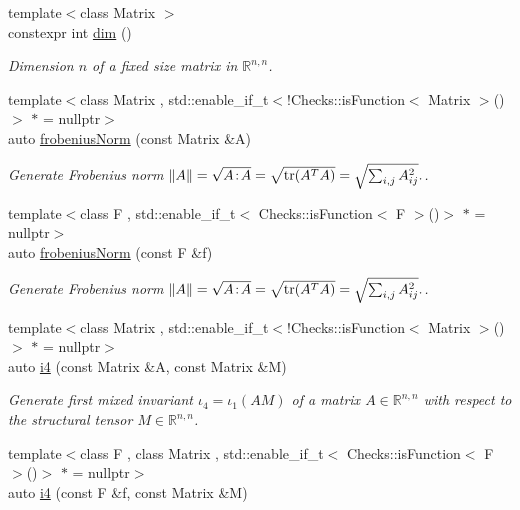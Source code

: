 \begin{DoxyCompactItemize}
{\footnotesize template$<$class Matrix $>$ }\\constexpr int \hyperlink{namespaceFunG_1_1LinearAlgebra_a13a029820c29d530274ae94968d642d4}{dim} ()
\begin{DoxyCompactList}\small\item\em Dimension $n$ of a fixed size matrix in $\mathbb{R}^{n,n}$. \end{DoxyCompactList}\item 
{\footnotesize template$<$class Matrix , std\-::enable\-\_\-if\-\_\-t$<$!\-Checks\-::is\-Function$<$ Matrix $>$()$>$ $\ast$  = nullptr$>$ }\\auto \hyperlink{group__LinearAlgebraGroup_gaa893e7d667dde98d2b119ca004745186}{frobenius\-Norm} (const Matrix \&A)
\begin{DoxyCompactList}\small\item\em Generate Frobenius norm $ \|A\| = \sqrt{A\negthinspace : \negthinspace A }= \sqrt{\mathrm{tr}(A^TA)} = \sqrt{\sum_{i,j} A_{ij}^2}. $. \end{DoxyCompactList}\item 
{\footnotesize template$<$class F , std\-::enable\-\_\-if\-\_\-t$<$ Checks\-::is\-Function$<$ F $>$()$>$ $\ast$  = nullptr$>$ }\\auto \hyperlink{group__LinearAlgebraGroup_gafa2f358f9310cecb787620ad8ec460a6}{frobenius\-Norm} (const F \&f)
\begin{DoxyCompactList}\small\item\em Generate Frobenius norm $ \|A\| = \sqrt{A\negthinspace : \negthinspace A }= \sqrt{\mathrm{tr}(A^TA)} = \sqrt{\sum_{i,j} A_{ij}^2}. $. \end{DoxyCompactList}\item 
{\footnotesize template$<$class Matrix , std\-::enable\-\_\-if\-\_\-t$<$!\-Checks\-::is\-Function$<$ Matrix $>$()$>$ $\ast$  = nullptr$>$ }\\auto \hyperlink{group__InvariantGroup_ga1898785172ecce11af0c27e54d555009}{i4} (const Matrix \&A, const Matrix \&M)
\begin{DoxyCompactList}\small\item\em Generate first mixed invariant $ \iota_4=\iota_1(AM) $ of a matrix $A\in\mathbb{R}^{n,n}$ with respect to the structural tensor $M\in\mathbb{R}^{n,n}$. \end{DoxyCompactList}\item 
{\footnotesize template$<$class F , class Matrix , std\-::enable\-\_\-if\-\_\-t$<$ Checks\-::is\-Function$<$ F $>$()$>$ $\ast$  = nullptr$>$ }\\auto \hyperlink{group__InvariantGroup_ga0df96cdb1e4b8b5a040f2adc97c51100}{i4} (const F \&f, const Matrix \&M)

\end{DoxyCompactItemize}
